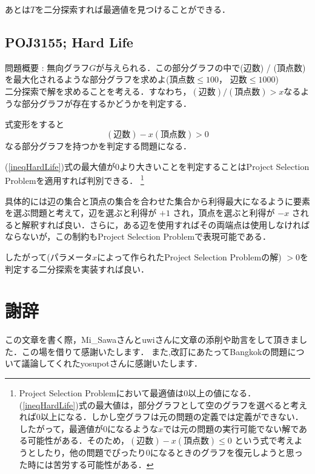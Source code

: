 \documentclass[13pt]{jarticle}
\theoremstyle{nonitalic} %
\begin{document}
あとは$T$を二分探索すれば最適値を見つけることができる．


\subsection{POJ3155; Hard Life}
\label{prob:hardlife}
問題概要 : 無向グラフ$G$が与えられる．この部分グラフの中で(辺数) / (頂点数)を最大化されるような部分グラフを求めよ(頂点数$\leq 100$， 辺数$\leq 1000$)\\

二分探索で解を求めることを考える．すなわち，$ (\textrm{辺数}) / (\textrm{頂点数})  > x$なるような部分グラフが存在するかどうかを判定する．

式変形をすると
\begin{equation}
  (\textrm{辺数}) - x (\textrm{頂点数}) > 0 \label{ineqHardLife}
\end{equation}
なる部分グラフを持つかを判定する問題になる．

(\ref{ineqHardLife})式の最大値が$0$より大きいことを判定することはProject Selection Problemを適用すれば判別できる． \footnote{ Project Selection Problemにおいて最適値は$0$以上の値になる．(\ref{ineqHardLife})式の最大値は，部分グラフとして空のグラフを選べると考えれば$0$以上になる．しかし空グラフは元の問題の定義では定義ができない．したがって，最適値が$0$になるような$x$では元の問題の実行可能でない解である可能性がある．そのため，$ (\textrm{辺数}) - x (\textrm{頂点数}) \leq 0 $  という式で考えようとしたり，他の問題でぴったり$0$になるときのグラフを復元しようと思った時には苦労する可能性がある．}

具体的には辺の集合と頂点の集合を合わせた集合から利得最大になるように要素を選ぶ問題と考えて，辺を選ぶと利得が $+1$ され，頂点を選ぶと利得が $-x$ されると解釈すれば良い．さらに，ある辺を使用すればその両端点は使用しなければならないが，この制約もProject Selection Problemで表現可能である． 

したがって(パラメータ$x$によって作られたProject Selection Problemの解) $>0$を判定する二分探索を実装すれば良い． 





\section*{謝辞}
この文章を書く際，Mi\_Sawaさんとuwiさんに文章の添削や助言をして頂きました．この場を借りて感謝いたします．
また,改訂にあたってBangkokの問題について議論してくれたyosupotさんに感謝いたします．
\end{document}
